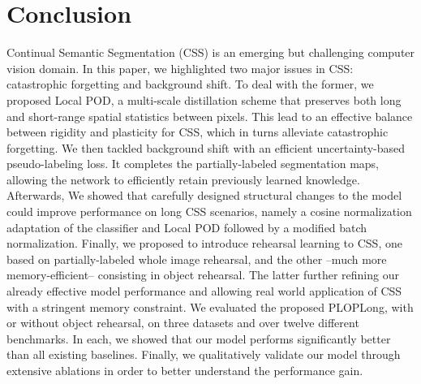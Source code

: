 \section{Conclusion}
\label{sec:seg_conclusion}

Continual Semantic Segmentation (\ac{CSS}) is an emerging but challenging computer vision domain. In this
paper, we highlighted two major issues in \ac{CSS}: catastrophic forgetting and background shift. To deal
with the former, we proposed Local POD, a multi-scale distillation scheme that preserves both long
and short-range spatial statistics between pixels. This lead to an effective balance between
rigidity and plasticity for \ac{CSS}, which in turns alleviate catastrophic forgetting. We then tackled
background shift with an efficient uncertainty-based pseudo-labeling loss. It completes the
partially-labeled segmentation maps, allowing the network to efficiently retain previously learned
knowledge. Afterwards, We showed that carefully designed structural changes to the model could
improve performance on long \ac{CSS} scenarios, namely a cosine normalization adaptation of the
classifier and Local POD followed by a modified batch normalization. Finally, we proposed to
introduce rehearsal learning to \ac{CSS}, one based on partially-labeled whole image rehearsal, and the
other --much more memory-efficient-- consisting in object rehearsal. The latter further refining our
already effective model performance and allowing real world application of \ac{CSS} with a stringent
memory constraint. We evaluated the proposed PLOPLong, with or without object rehearsal, on three
datasets and over twelve different benchmarks. In each, we showed that our model performs
significantly better than all existing baselines. Finally, we qualitatively validate our model
through extensive ablations in order to better understand the performance gain.
